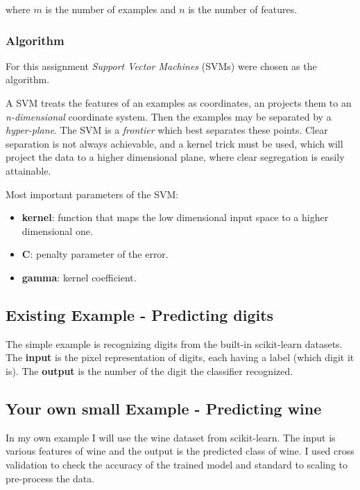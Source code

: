 \documentclass[a4paper,10pt]{article}
\begin{document}
  where $m$ is the number of examples and $n$ is the number of features.
  
  \subsubsection{Algorithm}
  For this assignment \textit{Support Vector Machines} (SVMs) were chosen as the algorithm. 
 
 A SVM treats the features of an examples as coordinates, an projects them to an \textit{n-dimensional }
 coordinate system. Then the examples may be separated by a \textit{hyper-plane}. 
 The SVM is a \textit{frontier} which best separates these points. 
 Clear separation is not always achievable, and a kernel trick must be used, which will project the
 data to a higher dimensional plane, where clear segregation is easily attainable.
 
 Most important parameters of the SVM:
 \begin{itemize}
 \item \textbf{kernel}: function that maps the low dimensional input space to a higher dimensional one.
 \item \textbf{C}: penalty parameter of the error.
 \item \textbf{gamma}: kernel coefficient.
 \end{itemize}
 
 \subsection{Existing Example - Predicting digits}
 
 The simple example is recognizing digits from the built-in scikit-learn datasets.
 The \textbf{input} is the pixel representation of digits, each having a label (which digit it is).
 The \textbf{output} is the number of the digit the classifier recognized. 
 


 
 \subsection{Your own small Example - Predicting wine}
 In my own example I will use the wine dataset from scikit-learn.
 The input is various features of wine and the output is the predicted class of wine.
 I used cross validation to check the accuracy of the trained model and
 standard to scaling to pre-process the data.
 
\end{document}
